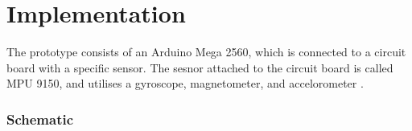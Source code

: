 \chapter{Implementation}

The prototype consists of an Arduino Mega 2560\citep{Arduino}, which is connected to a circuit board with a specific sensor. 
The sesnor attached to the circuit board is called MPU 9150, and utilises a gyroscope, magnetometer, and accelorometer \citep{MPU}.

\subsection{Schematic} 

\begin{minipage}{\linewidth}%
\label{schematic}
\end{minipage}\\